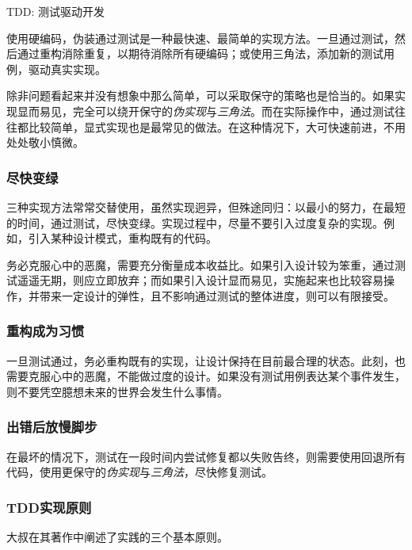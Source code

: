 \begin{content}
\begin{episode}{TDD: 测试驱动开发}
\begin{content}
\begin{enum}
\end{enum}

使用硬编码，伪装通过测试是一种最快速、最简单的实现方法。一旦通过测试，然后通过重构消除重复，以期待消除所有硬编码；或使用三角法，添加新的测试用例，驱动真实实现。

除非问题看起来并没有想象中那么简单，可以采取保守的策略也是恰当的。如果实现显而易见，完全可以绕开保守的\emph{伪实现}与\emph{三角法}。而在实际操作中，通过测试往往都比较简单，显式实现也是最常见的做法。在这种情况下，大可快速前进，不用处处敬小慎微。

\subsubsection{尽快变绿}

三种实现方法常常交替使用，虽然实现迥异，但殊途同归：以最小的努力，在最短的时间，通过测试，尽快变绿。实现过程中，尽量不要引入过度复杂的实现。例如，引入某种设计模式，重构既有的代码。

务必克服心中的恶魔，需要充分衡量成本收益比。如果引入设计较为笨重，通过测试遥遥无期，则应立即放弃；而如果引入设计显而易见，实施起来也比较容易操作，并带来一定设计的弹性，且不影响通过测试的整体进度，则可以有限接受。

\subsubsection{重构成为习惯}

一旦测试通过，务必重构既有的实现，让设计保持在目前最合理的状态。此刻，也需要克服心中的恶魔，不能做过度的设计。如果没有测试用例表达某个事件发生，则不要凭空臆想未来的世界会发生什么事情。

\subsubsection{出错后放慢脚步}

在最坏的情况下，测试在一段时间内尝试修复都以失败告终，则需要使用回退所有代码，使用更保守的\emph{伪实现}与\emph{三角法}，尽快修复测试。

\subsubsection{TDD实现原则}

大叔在其著作中阐述了实践的三个基本原则。


\end{content}
\end{episode}
\end{content}
